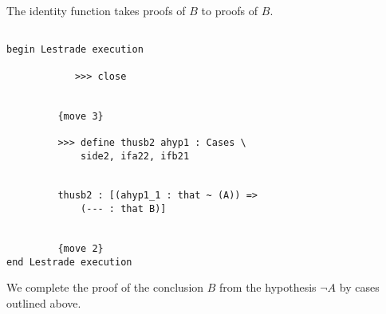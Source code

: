 \documentclass[12pt]{article}
\begin{document}
The identity function takes proofs of $B$ to proofs of $B$.

\begin{verbatim}

begin Lestrade execution

            >>> close


         {move 3}

         >>> define thusb2 ahyp1 : Cases \
             side2, ifa22, ifb21


         thusb2 : [(ahyp1_1 : that ~ (A)) => 
             (--- : that B)]


         {move 2}
end Lestrade execution
\end{verbatim}

We complete the proof of the conclusion $B$ from the hypothesis $\neg A$ by cases outlined above.
\end{document}
